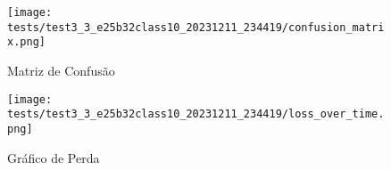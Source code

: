\begin{figure}[ht]
 \begin{center}
   \texttt{[image: tests/test3\_3\_e25b32class10\_20231211\_234419/confusion\_matrix.png]}
  \caption{Matriz de Confusão}
  \label{fig:fig03}
 \end{center}
\end{figure}

\begin{figure}[ht]
 \begin{center}
   \texttt{[image: tests/test3\_3\_e25b32class10\_20231211\_234419/loss\_over\_time.png]}
  \caption{Gráfico de Perda}
  \label{fig:fig04}
 \end{center}
\end{figure}
